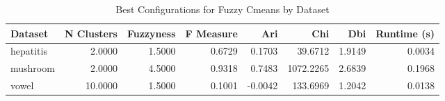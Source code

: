 \begin{table*}[ht!]
\caption{Best Configurations for Fuzzy Cmeans by Dataset}
\label{tab:best_configs_fuzzy_cmeans}
\begin{tabular}{lrrrrrrr}
Dataset & N Clusters & Fuzzyness & F Measure & Ari & Chi & Dbi & Runtime (s) \\\midrule

hepatitis & 2.0000 & 1.5000 & 0.6729 & 0.1703 & 39.6712 & 1.9149 & 0.0034 \\
mushroom & 2.0000 & 4.5000 & 0.9318 & 0.7483 & 1072.2265 & 2.6839 & 0.1968 \\
vowel & 10.0000 & 1.5000 & 0.1001 & -0.0042 & 133.6969 & 1.2042 & 0.0138 \\
\end{tabular}
\end{table*}
